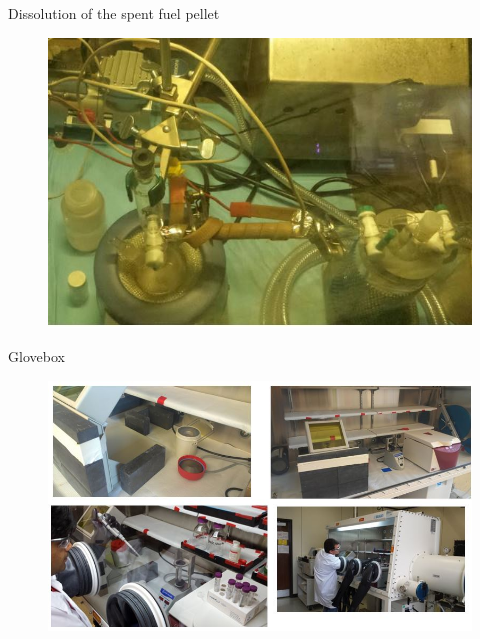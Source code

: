 \documentclass{beamer}
\begin{document}
\begin{frame}{Dissolution of the spent fuel pellet}
      \begin{figure}[H]
        \vspace*{-1cm}
        \begin{center}
	   \includegraphics[scale = 0.65]{figures/dissolution}
	\end{center}
      \end{figure}
\end{frame}

\begin{frame}{Glovebox}
      \begin{figure}[H]
        \vspace*{-1cm}
        \begin{center}
	   \includegraphics[scale = 0.5]{figures/glovebox}
	\end{center}
      \end{figure}
\end{frame}
\end{document}
